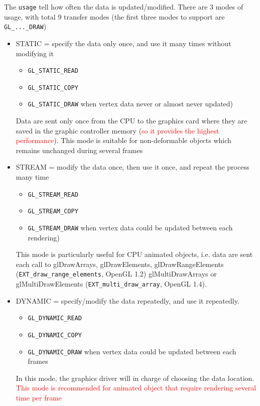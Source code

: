 The \verb!usage! tell how often the data is updated/modified. There
are 3 modes of usage, with total 9 transfer modes (the first three
modes to support are \verb!GL_..._DRAW!)

\begin{itemize}
\item STATIC = specify the data only once, and use it many times
  without modifying it
  \begin{itemize}
  \item \verb!GL_STATIC_READ!
  \item \verb!GL_STATIC_COPY!
  \item \verb!GL_STATIC_DRAW! when vertex data never or almost never
    updated)
  \end{itemize}

  Data are sent only once from the CPU to the graphics card where they
  are saved in the graphic controller memory
  (\textcolor{red}{so it provides the highest performance}). This mode
  is suitable for non-deformable objects which remains unchanged
  during several frames

\item STREAM = modify the data once, then use it once, and repeat the
  process many time
  \begin{itemize}
  \item \verb!GL_STREAM_READ! 
  \item \verb!GL_STREAM_COPY!
  \item \verb!GL_STREAM_DRAW! when vertex data could be updated
    between each rendering)
  \end{itemize}

  This mode is particularly useful for CPU animated objects, i.e. data
  are sent each call to glDrawArrays, glDrawElements,
  glDrawRangeElements (\verb!EXT_draw_range_elements!, OpenGL 1.2)
  glMultiDrawArrays or glMultiDrawElements
  (\verb!EXT_multi_draw_array!, OpenGL 1.4).


\item DYNAMIC = specify/modify the data repeatedly, and use it
  repeatedly. 
  \begin{itemize}
  \item \verb!GL_DYNAMIC_READ! 
  \item \verb!GL_DYNAMIC_COPY!
  \item \verb!GL_DYNAMIC_DRAW! when vertex data could be updated
    between each frames
  \end{itemize}
  
  In this mode, the graphics driver will in charge of choosing the
  data location.
  \textcolor{red}{This mode is recommended for animated object that
    require rendering several time per frame}
\end{itemize}


